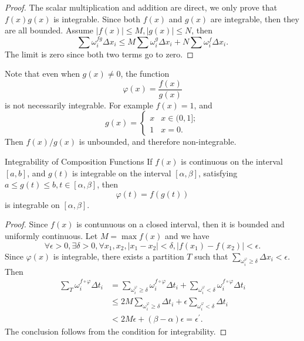 \begin{proof}
  The scalar multiplication and addition are direct,
  we only prove that $f(x)g(x)$ is integrable.
  Since both $f(x)$ and $g(x)$ are integrable, then they are all bounded.
  Assume $|f(x)| \leq M, |g(x)| \leq N$, then
  \begin{equation}
    \sum \omega_i^{fg} \Delta x_i \leq
    M \sum \omega_i^g \Delta x_i + N \sum \omega_i^f \Delta x_i.
  \end{equation}
  The limit is zero since both two terms go to zero.
\end{proof}

\begin{note}
  Note that even when $g(x) \neq 0$, the function
  \begin{equation}
    \varphi(x) = \frac{f(x)}{g(x)}
  \end{equation}
  is not necessarily integrable.
  For example $f(x) = 1$, and
  \begin{equation}
    g(x) =
    \begin{cases}
      x & x \in (0, 1];\\
      1 & x = 0.
    \end{cases}
  \end{equation}
  Then $f(x)/g(x)$ is unbounded, and therefore non-integrable.
\end{note}

\begin{proposition}{Integrability of Composition Functions}{}
  If $f(x)$ is continuous on the interval $[a, b]$,
  and $g(t)$ is integrable on the interval $[\alpha, \beta]$,
  satisfying $a \leq g(t) \leq b, t \in [\alpha, \beta]$,
  then
  \begin{equation}
    \varphi(t) = f(g(t))
  \end{equation}
  is integrable on $[\alpha, \beta]$.
\end{proposition}

\begin{proof}
  Since $f(x)$ is contunuous on a closed interval, then it is bounded and
  uniformly continuous. Let $M = \max f(x)$ and we have
  \begin{equation}
    \forall \epsilon > 0, \exists \delta > 0, \forall x_1, x_2, |x_1 - x_2| < \delta,
    |f(x_1) - f(x_2)| < \epsilon.
  \end{equation}
  Since $\varphi(x)$ is integrable, there exists a partition $T$ such that
  $\sum \limits_{\omega_i^{\varphi} \geq \delta} \Delta x_i < \epsilon$.
  Then
  \begin{align}
    \sum\limits_T \omega_i^{f \circ \varphi} \Delta t_i &= \sum\limits_{\omega_i^{\varphi} \geq \delta} \omega_i^{f \circ \varphi} \Delta t_i + \sum\limits_{\omega_i^{\varphi} < \delta} \omega_i^{f \circ \varphi} \Delta t_i\\
    &\leq 2M \sum\limits_{\omega_i^{\varphi} \geq \delta} \Delta t_i + \epsilon \sum\limits_{\omega_i^{\varphi} < \delta} \Delta t_i\\
    &< 2M \epsilon + (\beta - \alpha)\epsilon = \epsilon^{\prime}.
  \end{align}
  The conclusion follows from the condition for integrability.
\end{proof}

